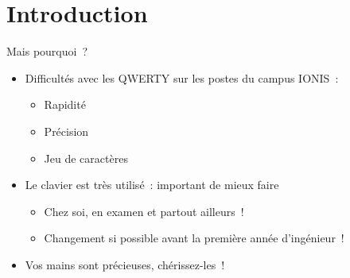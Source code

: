 \section*{Introduction}

\begin{frame}{Mais pourquoi~?}
  \begin{itemize}
    \item Difficultés avec les QWERTY sur les postes du campus IONIS~: \pause
      \begin{itemize}
        \item Rapidité \pause
        \item Précision \pause
        \item Jeu de caractères
      \end{itemize}\pause

    \item Le clavier est très utilisé~: important de mieux faire \pause
      \begin{itemize}
        \item Chez soi, en examen et partout ailleurs~! \pause
        \item Changement si possible avant la première année d’ingénieur~!
      \end{itemize}\pause
	\item Vos mains sont précieuses, chérissez-les~!
  \end{itemize}
\end{frame}
